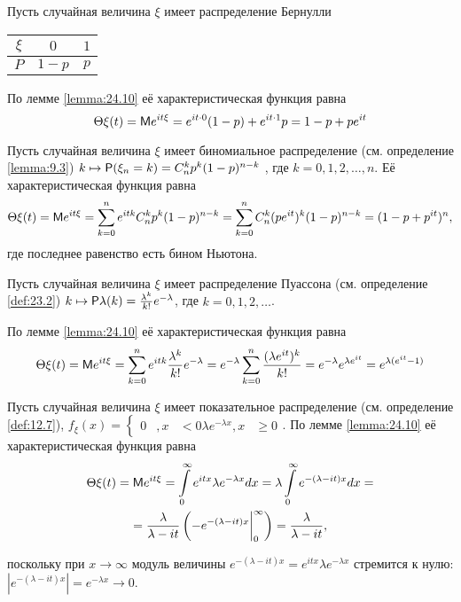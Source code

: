 \begin{example}
\label{ex:25.1}
Пусть случайная величина $\xi$ имеет распределение Бернулли
\begin{center}
\begin{tabular}{|c|c|c|}
\hline
$\xi$ & $0$ & $1$\\ \hline
$P$ & $1-p$ & $p$\\ \hline
\end{tabular}	
\end{center}
По лемме \ref{lemma:24.10} её характеристическая функция равна
$$\Theta\xi (t)=\M e^{it\xi}=e^{it\cdot0}(1-p)+e^{it\cdot1}p=1-p+pe^{it}$$
\end{example}

\begin{example}
\label{ex:25.2}
Пусть случайная величина $\xi$ имеет биномиальное распределение (см. определение \ref{lemma:9.3})  $k \mapsto \P(\xi_n=k)=C_n^k p^k (1-p)^{n-k}$ , где 
$k=0, 1, 2, \ldots , n$. Её характеристическая функция равна
%
%
$$\Theta\xi (t)=\M e^{it\xi}=
\sum\limits_{k=0}^n e^{itk} C_n^k p^k (1-p)^{n-k}=
\sum\limits_{k=0}^n C_n^k (pe^{it})^k (1-p)^{n-k}=(1-p+p^{it})^n,
$$
где последнее равенство есть бином Ньютона.
\end{example}


\begin{example}
\label{ex:25.3}
Пусть случайная величина $\xi$ имеет распределение Пуассона (см. определение \ref{def:23.2}) $k \mapsto \P\lambda (k)=\frac{\lambda^k}{k!}e^{-\lambda}$, где $k=0, 1, 2, \ldots$. 

По лемме \ref{lemma:24.10} её характеристическая функция равна
%
%
$$\Theta\xi (t)=\M e^{it\xi}=
\sum\limits_{k=0}^n e^{itk} \frac{\lambda^k}{k!}e^{-\lambda}=
e^{-\lambda}\sum\limits_{k=0}^n \frac{(\lambda e^{it})^k}{k!}=
e^{-\lambda}e^{\lambda e^{it}}=
e^{\lambda(e^{it}-1)}
$$
\end{example}

\begin{example}
\label{ex:25.4}
Пусть случайная величина $\xi$ имеет показательное распределение (см. определение \ref{def:12.7}), 
%
$f_\xi(x)=\left\{
\begin{aligned}
	0&, x&<0
	\lambda e^{-\lambda x}, x&\geq0
\end{aligned}
\right.$.
%
По лемме \ref{lemma:24.10} её характеристическая функция равна
%
%
\begin{gather*}
\Theta\xi (t)=\M e^{it\xi}=
\int\limits_0^\infty e^{itx}\lambda e^{-\lambda x} dx=
\lambda\int\limits_0^\infty e^{-(\lambda-it)x} dx=\\=
\frac{\lambda}{\lambda-it}
\left(
	-e^{-(\lambda-it)x}\bigg|_0^\infty
\right)=\frac{\lambda}{\lambda-it},
\end{gather*}


поскольку при $x \to \infty$ модуль величины $e^{-(\lambda-it)x}=e^{itx}\lambda e^{-\lambda x}$ стремится к
нулю: $|e^{-(\lambda-it)x}|=e^{-\lambda x}\to0$.
\end{example}

